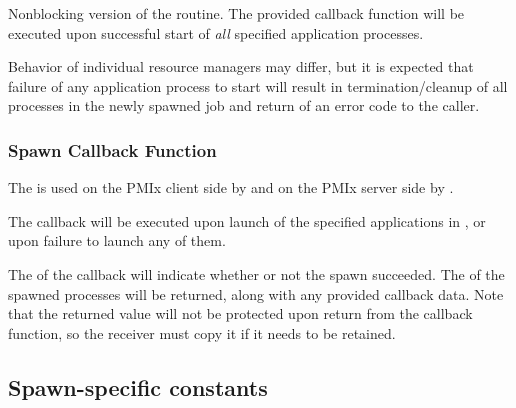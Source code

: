 \descr

Nonblocking version of the  routine. The provided callback function will be executed upon successful start of \textit{all} specified application processes.

\adviceuserstart
Behavior of individual resource managers may differ, but it is expected that failure of any application process to start will result in termination/cleanup of all processes in the newly spawned job and return of an error code to the caller.
\adviceuserend

\subsubsection{Spawn Callback Function}

\summary

The  is used on the PMIx client side by  and on the PMIx server side by .


\begin{arglist}
\end{arglist}


\descr

The callback will be executed upon launch of the specified applications in , or upon failure to launch any of them.

The  of the callback will indicate whether or not the spawn succeeded.
The  of the spawned processes will be returned, along with any provided callback data.
Note that the returned  value will not be protected upon return from the callback function, so the receiver must copy it if it needs to be retained.

\subsection{Spawn-specific constants}
\label{api:struct:constants:spawn}

